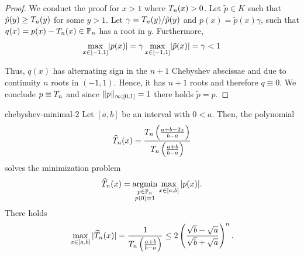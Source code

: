 \begin{proof}
  We conduct the proof for $x>1$ where $T_n(x) > 0$.
  Let $\tilde p\in K$ such that
  $\tilde p(y) \ge T_n(y)$ for some $y>1$. Let
  $\gamma = T_n(y)/\tilde p(y)$ and
  $p(x) = \tilde p(x)\gamma$, such that
  $q(x) = p(x) - T_n(x) \in \mathbb P_n$ has a root in $y$.
  Furthermore,
  \begin{gather}
    \max_{x\in[-1,1]} \lvert p(x)\rvert = \gamma\max_{x\in[-1,1]} \lvert\tilde p(x)\rvert = \gamma < 1
  \end{gather}

  Thus, $q(x)$ has alternating sign in the $n+1$ Chebyshev abscissae and due to continuity $n$ roots in
  $(-1,1)$. Hence, it has $n+1$ roots and therefore
  $q \equiv 0$. We conclude $p \equiv T_n$ and since
  $\lVert p\rVert_{\infty;[0,1]} = 1$ there holds $\tilde p = p$.
\end{proof}

\begin{Corollary}{chebyshev-minimal-2}
  Let $[a,b]$ be an interval with $0 < a$. Then, the polynomial
  \begin{gather}
    \widehat \pchebyshev_n(x)
    = \frac{\pchebyshev_n\left(\frac{a+b-2x}{b-a}\right)}%
    {\pchebyshev_n\left(\frac{a+b}{b-a}\right)}
  \end{gather}
  solves the minimization problem
  \begin{gather}
    \widehat {T}_n(x)
    = \operatorname*{argmin}_{\substack{p\in\mathbb P_n\\p(0) = 1}}
    \max_{x\in[a,b]}{\lvert p(x)\rvert}.
  \end{gather}
  There holds
  \begin{gather}
    \label{eq:chebyshev-cg1}
    \max_{x\in[a,b]}{\lvert\widehat {T}_n(x)\rvert}
    = \frac1{T_n\left(\frac{a+b}{b-a}\right)}
    \le 2 \left(\frac{\sqrt b-\sqrt a}{\sqrt b + \sqrt a}\right)^n.
  \end{gather}
\end{Corollary}

